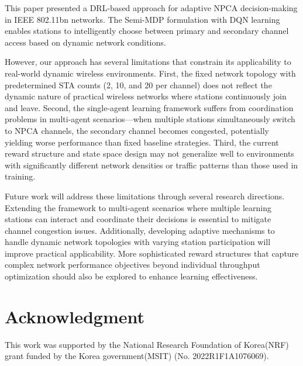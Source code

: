 \documentclass[conference]{IEEEtran}
\begin{document}
This paper presented a DRL-based approach for adaptive NPCA decision-making in IEEE 802.11bn networks. The Semi-MDP formulation with DQN learning enables stations to intelligently choose between primary and secondary channel access based on dynamic network conditions.


However, our approach has several limitations that constrain its applicability to real-world dynamic wireless environments. First, the fixed network topology with predetermined STA counts (2, 10, and 20 per channel) does not reflect the dynamic nature of practical wireless networks where stations continuously join and leave. Second, the single-agent learning framework suffers from coordination problems in multi-agent scenarios—when multiple stations simultaneously switch to NPCA channels, the secondary channel becomes congested, potentially yielding worse performance than fixed baseline strategies. Third, the current reward structure and state space design may not generalize well to environments with significantly different network densities or traffic patterns than those used in training.

Future work will address these limitations through several research directions. Extending the framework to multi-agent scenarios where multiple learning stations can interact and coordinate their decisions is essential to mitigate channel congestion issues. Additionally, developing adaptive mechanisms to handle dynamic network topologies with varying station participation will improve practical applicability. More sophisticated reward structures that capture complex network performance objectives beyond individual throughput optimization should also be explored to enhance learning effectiveness.


\section*{Acknowledgment}

This work was supported by the National Research Foundation of Korea(NRF) grant funded by the Korea government(MSIT) (No. 2022R1F1A1076069).




\end{document}
